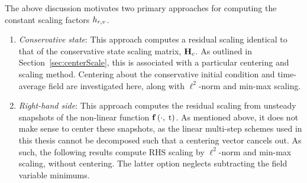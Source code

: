 The above discussion motivates two primary approaches for computing the constant scaling factors $h_{r,v}$. 
\begin{enumerate}
    \item \textit{Conservative state}: This approach computes a residual scaling identical to that of the conservative state scaling matrix, $\consScale$. As outlined in Section~\ref{sec:centerScale}, this is associated with a particular centering and scaling method. Centering about the conservative initial condition and time-average field are investigated here, along with $\ell^2$-norm and min-max scaling.
    \item \textit{Right-hand side}: This approach computes the residual scaling from unsteady snapshots of the non-linear function $\mathbf{f} \left(\cdot,\; \text{t}\right)$. As mentioned above, it does not make sense to center these snapshots, as the linear multi-step schemes used in this thesis cannot be decomposed such that a centering vector cancels out. As such, the following results compute RHS scaling by $\ell^2$-norm and min-max scaling, without centering. The latter option neglects subtracting the field variable minimums. 
\end{enumerate}